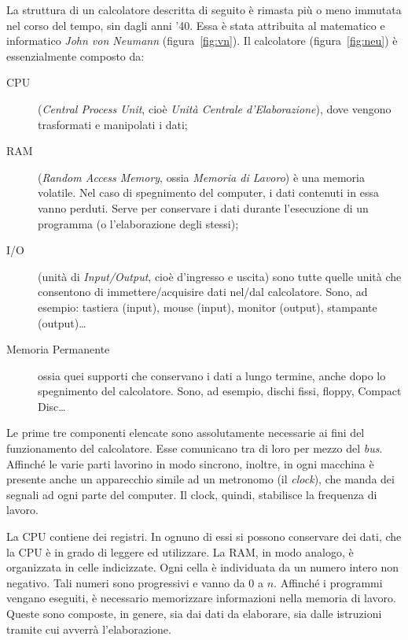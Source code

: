 La struttura di un calcolatore descritta di seguito è rimasta più o meno immutata nel corso del tempo, sin dagli anni '40. Essa è stata attribuita al matematico e informatico \emph{John von Neumann} (figura~\vref{fig:vn}). Il calcolatore (figura~\vref{fig:neu}) è essenzialmente composto da:
\begin{description}
	\item
[CPU] (\emph{Central Process Unit}, cioè \emph{Unità Centrale d'Elaborazione}), dove vengono  trasformati e manipolati i dati;
	\item
[RAM] (\emph{Random Access Memory}, ossia \emph{Memoria di Lavoro}) è una memoria volatile. Nel caso di spegnimento del computer, i dati contenuti in essa vanno perduti. Serve per conservare i dati durante l'esecuzione di un programma (o l'elaborazione degli stessi);
	\item
[I/O] (unità di \emph{Input/Output}, cioè d'ingresso e uscita) sono tutte quelle unità che consentono di immettere/acquisire dati nel/dal calcolatore. Sono, ad esempio: tastiera (input), mouse (input), monitor (output), stampante (output)\dots
	\item
[Memoria Permanente] ossia quei supporti che conservano i dati a lungo termine, anche dopo lo spegnimento del calcolatore. Sono, ad esempio, dischi fissi, floppy, Compact Disc\dots
\end{description}

Le prime tre componenti elencate sono assolutamente necessarie ai fini del  funzionamento del calcolatore.  Esse comunicano tra di loro per mezzo del \emph{bus}. Affinché le varie parti lavorino in modo sincrono, inoltre, in ogni macchina è presente anche un apparecchio simile ad un metronomo (il \emph{clock}), che manda dei segnali ad ogni parte del computer. Il clock, quindi, stabilisce la frequenza di lavoro.



La CPU contiene dei registri. In ognuno di essi si possono conservare dei dati, che la CPU è in grado di leggere ed utilizzare. La RAM, in modo analogo, è organizzata in celle indicizzate. Ogni cella è individuata da un numero intero non negativo. Tali numeri sono progressivi e vanno da $0$ a $n$. Affinché i programmi vengano eseguiti, è necessario memorizzare informazioni nella memoria di lavoro. Queste sono composte, in genere, sia dai dati da elaborare, sia dalle istruzioni tramite cui avverrà l'elaborazione.

